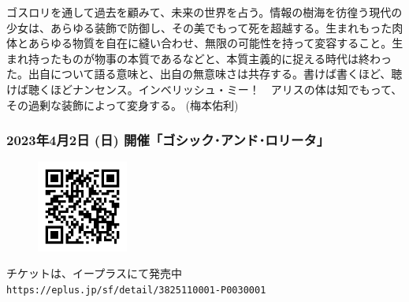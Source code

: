 \documentclass[a4paper, twoside]{ltjsarticle}
\begin{document}
ゴスロリを通して過去を顧みて、未来の世界を占う。情報の樹海を彷徨う現代の少女は、あらゆる装飾で防御し、その美でもって死を超越する。生まれもった肉体とあらゆる物質を自在に縫い合わせ、無限の可能性を持って変容すること。生まれ持ったものが物事の本質であるなどと、本質主義的に捉える時代は終わった。出自について語る意味と、出自の無意味さは共存する。書けば書くほど、聴けば聴くほどナンセンス。インベリッシュ・ミー！　アリスの体は知でもって、その過剰な装飾によって変身する。 \qquad (梅本佑利)

\subsubsection*{2023年4月2日 (日) 開催「ゴシック･アンド･ロリータ」}

\begin{figure}
 \centering
   \includegraphics[width=3cm,clip]{gl_qrcode.png}
\label*{チケット販売}
\end{figure}

チケットは、イープラスにて発売中\\
{\tt https://eplus.jp/sf/detail/3825110001-P0030001}
\end{document}
